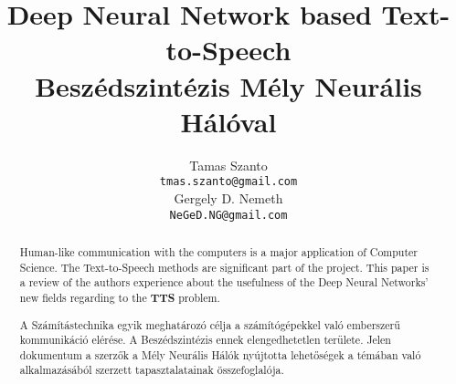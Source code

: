 \documentclass{article}
\title{Deep Neural Network based Text-to-Speech
	\\
	Beszédszintézis Mély Neurális Hálóval}
\author{
	Tamas Szanto\\
	\texttt{tmas.szanto@gmail.com} \\
	\AND
	Gergely D. Nemeth\\
	\texttt{NeGeD.NG@gmail.com} \\
}
\begin{document}

\maketitle
\chapter{}
\begin{abstract}
  Human-like communication with the computers is a major application of Computer Science. The Text-to-Speech methods are significant part of the project. This paper is a review of the authors experience about the usefulness of the Deep Neural Networks' new fields regarding to the \textbf{TTS} problem.
\end{abstract}

\begin{abstract}
	A Számítástechnika egyik meghatározó célja a számítógépekkel való emberszerű kommunikáció elérése. A Beszédszintézis ennek elengedhetetlen területe. Jelen dokumentum a szerzők a Mély Neurális Hálók nyújtotta lehetőségek a témában való alkalmazásából szerzett tapasztalatainak összefoglalója. 
\end{abstract}

\clearpage
\chapter{}

\clearpage
\chapter{}

\clearpage
\chapter{}

\clearpage
\chapter{}

\clearpage
\chapter{}

\clearpage
\chapter{}

\clearpage
\chapter{}

\chapter{}

\end{document}
